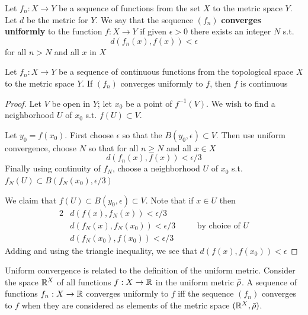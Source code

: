 \documentclass[11pt]{article}
\begin{document}
\begin{definition}[]
Let \(f_n:X\to Y\) be a sequence of functions from the set \(X\) to the metric space \(Y\).
Let \(d\) be the metric for \(Y\). We say that the sequence \((f_n)\) \textbf{converges uniformly} to the
function \(f:X\to Y\) if given \(\epsilon>0\) there exists an integer \(N\) s.t.
\begin{equation*}
d(f_n(x),f(x))<\epsilon
\end{equation*}
for all \(n>N\) and all \(x\) in \(X\)
\end{definition}

\begin{theorem}
Let \(f_n:X\to Y\) be a sequence of continuous functions from the topological space \(X\) to the
metric space \(Y\). If \((f_n)\) converges uniformly to \(f\), then \(f\) is continuous
\end{theorem}

\begin{proof}
Let \(V\)  be open in \(Y\); let \(x_0\) be a point of \(f^{-1}(V)\). We wish to find a
neighborhood \(U\) of \(x_0\) s.t. \(f(U)\subset V\).

Let \(y_0=f(x_0)\). First choose \(\epsilon\) so that the \(B(y_0,\epsilon)\subset V\). Then use uniform convergence,
choose \(N\) so that for all \(n\ge N\) and all \(x\in X\)
\begin{equation*}
d(f_n(x),f(x))<\epsilon/3
\end{equation*}
Finally using continuity of \(f_N\), choose a neighborhood \(U\) of \(x_0\) s.t.
\(f_N(U)\subset B(f_N(x_0),\epsilon/3)\)

We claim that \(f(U)\subset B(y_0,\epsilon)\subset V\). Note that if \(x\in U\) then
\begin{alignat*}{2}
&d(f(x),f_N(x))<\epsilon/3\quad&&\\
&d(f_N(x),f_N(x_0))<\epsilon/3\quad&&\text{by choice of }U\\
&d(f_N(x_0),f(x_0))<\epsilon/3
\end{alignat*}
Adding and using the triangle inequality, we see that \(d(f(x),f(x_0))<\epsilon\)
\end{proof}

\begin{remark}
Uniform convergence is related to the definition of the uniform metric. Consider the
space \(\mathbb{R}^X\) of all functions \(f:X\to\mathbb{R}\) in the uniform metric \(\bar{\rho}\). A sequence of
functions \(f_n:X\to\mathbb{R}\) converges uniformly to \(f\) iff the sequence \((f_n)\) converges to \(f\)
when they are considered as elements of the metric space \((\mathbb{R}^X,\bar{\rho})\).
\end{remark}
\end{document}
